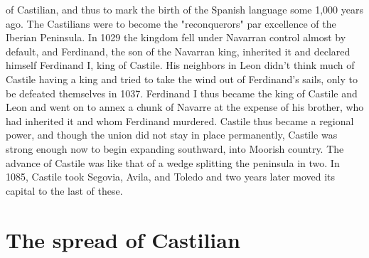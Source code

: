 of Castilian, and thus to mark the birth of the Spanish language some
1,000 years ago.
The Castilians were to become the "reconquerors" par excellence of the Iberian Peninsula. In 1029 the kingdom fell under Navarran control almost by default, and Ferdinand, the son of the Navarran
king, inherited it and declared himself Ferdinand I, king of Castile. His
neighbors in Leon didn't think much of Castile having a king and tried
to take the wind out of Ferdinand's sails, only to be defeated themselves in 1037. Ferdinand I thus became the king of Castile and Leon
and went on to annex a chunk of Navarre at the expense of his brother,
who had inherited it and whom Ferdinand murdered.
Castile thus became a regional power, and though the union
did not stay in place permanently, Castile was strong enough now
to begin expanding southward, into Moorish country. The advance
of Castile was like that of a wedge splitting the peninsula in two.
In 1085, Castile took Segovia, Avila, and Toledo and two years later
moved its capital to the last of these.

\section{The spread of Castilian}

